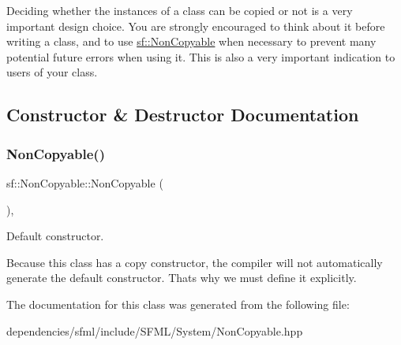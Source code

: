Deciding whether the instances of a class can be copied or not is a very important design choice. You are strongly encouraged to think about it before writing a class, and to use \hyperlink{classsf_1_1_non_copyable}{sf\+::\+Non\+Copyable} when necessary to prevent many potential future errors when using it. This is also a very important indication to users of your class. 

\subsection{Constructor \& Destructor Documentation}
\mbox{\label{classsf_1_1_non_copyable_a2110add170580fdb946f887719da6860}} 
\subsubsection{\texorpdfstring{Non\+Copyable()}{NonCopyable()}}
{\footnotesize\ttfamily sf\+::\+Non\+Copyable\+::\+Non\+Copyable (\begin{DoxyParamCaption}{ }\end{DoxyParamCaption})\hspace{0.3cm}{\ttfamily [inline]}, {\ttfamily [protected]}}



Default constructor. 

Because this class has a copy constructor, the compiler will not automatically generate the default constructor. That\textquotesingle{}s why we must define it explicitly. 

The documentation for this class was generated from the following file\+:\begin{DoxyCompactItemize}
\item 
dependencies/sfml/include/\+S\+F\+M\+L/\+System/Non\+Copyable.\+hpp\end{DoxyCompactItemize}

